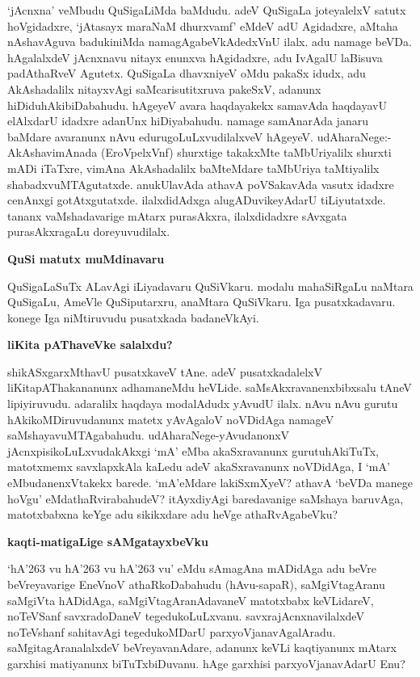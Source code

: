\noindent
`jAcnxna' veMbudu QuSigaLiMda baMdudu. adeV QuSigaLa joteyalelxV satutx 
hoVgidadxre, `jAtasayx mara\-NaM dhurxvamf'\label{122} eMdeV adU Agidadxre, aMtaha nAshavAguva badukiniMda namagAgabeVkAdedxVnU ilalx. adu namage beVDa. hAgalalxdeV jAcnxnavu nitayx enunxva hAgidadxre, adu IvAgalU laBisuva padA\-thaRveV Agutetx. QuSigaLa dhavxniyeV oMdu pakaSx idudx, adu AkAshadalilx nitayxvAgi saMcarisutitxruva pakeSxV, adanunx\- hiDidu\-hAki\-biDa\-bahudu. hAgeyeV avara haqdayakekx samavAda haqdayavU elAlxdarU idadxre adanUnx\-
hiDi\-yabahudu. namage samAnarAda janaru baMdare avaranunx nAvu edurugoLuLxvudilalxveV hAgeyeV. udA\-haraNege:- AkAshavimAnada (EroVpelxVnf) shurxtige takakxMte taMbUriyalilx shurxti mADi iTaTxre, vimAna AkAsha\-dalilx baMteMdare taMbUriya taMtiyalilx shabadxvuMTAgutatxde. anukUlavAda athavA poVSaka\-vAda vasutx idadxre cenAnxgi gotAtxgutatxde. ilalxdidAdxga alugADuvikeyAdarU tiLiyutatxde. tananx vaMshadava\-rige mAtarx purasAkxra, ilalxdidadxre sAvxgata purasAkxragaLu doreyuvudilalx.

{\medskip
\noindent
{\large\bf QuSi matutx muMdinavaru}}\label{page123}
\medskip

\noindent
QuSigaLaSuTx ALavAgi iLiyadavaru QuSiVkaru. modalu mahaSiRgaLu naMtara QuSigaLu, AmeVle QuSiputarxru, anaMtara QuSiVkaru. Iga pusatxkadavaru. konege Iga niMtiruvudu pusatxkada badaneVkAyi.

{\medskip
\noindent
{\large\bf liKita pAThaveVke salalxdu?}}\label{page123}
\medskip

\noindent
shikASxgarxMthavU pusatxkaveV tAne. adeV pusatxkadalelxV liKitapAThakananunx adhamaneMdu heVLide. saMsAkxrava\-nenxbibxsalu tAneV lipiyiruvudu. adaralilx haqdaya modalAdudx yAvudU ilalx. nAvu nAvu gurutu hAkikoMDiruvudanunx matetx yAvAgaloV noVDidAga namageV saMshayavuMTAgabahudu. udA\-hara\-Nege-yAvudanonxV jAcnxpisikoLuLxvudakAkxgi `mA' eMba akaSxravanunx gurutuhAkiTuTx, matotxmemx savxlapx\-kAla kaLedu adeV akaSxravanunx noVDidAga, I `mA' eMbudanenxVtakekx barede. `mA'\break eMdare lakiSxmXyeV?\- athavA `beVDa manege hoVgu'  eMdathaRvirabahudeV? itAyxdi\-yAgi baredavanige saMshaya baru\-vAga, matotx\-babxna keYge adu sikikxdare adu heVge athaRvAgabeVku?

{\bigskip
\noindent
{\large\bf kaqti-matigaLige sAMgatayxbeVku}}\label{page123}
\medskip

\noindent
`hA\char'263 vu hA\char'263 vu hA\char'263 vu' eMdu sAmagAna mADidAga adu beVre beVreyavarige EneVnoV athaR\-koDa\-bahudu (hAvu-sapaR), saMgiVtagAranu saMgiVta hADidAga, saMgiVtagAranAdavaneV matotxbabx keVLi\-dareV, noTeVSanf savxradoDaneV tegedukoLuLx\-vanu. savxrajAcnxnavilalxdeV noTeVshanf sahitavAgi tegedu\-koMDarU parxyoVjana\-vAga\-lAradu. saMgitagAranalalxdeV beVreyavanAdare, adanunx keVLi kaqtiyanunx mAtarx \hbox{garxhisi} matiyanunx biTuTxbiDuvanu. hAge \hbox{garxhisi} parxyoVjanavAdarU Enu?

